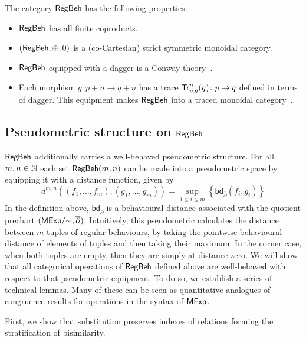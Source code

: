 \begin{theorem}
	The category $\mathsf{RegBeh}$ has the following properties:
	\begin{itemize}
		\item $\mathsf{RegBeh}$ has all finite coproducts. 
		\item $(\mathsf{RegBeh}, \oplus, 0)$ is a (co-Cartesian) strict symmetric monoidal category.
		\item $\mathsf{RegBeh}$ equipped with a dagger is a Conway theory~\cite{Esik:1999:Group}.
		\item Each morphism $g \colon p + n \to q + n$ has a trace $\mathsf{Tr}^{n}_{p,q}(g) \colon p \to q$ defined in terms of dagger. This equipment makes $\mathsf{RegBeh}$ into a traced monoidal category~\cite{Joyal:1996:Traced}. 
	\end{itemize}
\end{theorem} 
\subsection{Pseudometric structure on $\mathsf{RegBeh}$}
$\mathsf{RegBeh}$ additionally carries a well-behaved pseudometric structure. For all $m,n \in \mathbb{N}$ each set $\mathsf{RegBeh}(m,n)$ can be made into a pseudometric space by equipping it with a distance function, given by $$d^{m,n}((f_1, \dots, f_m), (g_1, \dots, g_m)) = \sup_{1 \leq i \leq m} \left\{ \mathsf{bd}_{\overline{\partial}}(f_i, g_i) \right\}$$
In the definition above, $\mathsf{bd}_{\overline{\partial}}$ is a behavioural distance associated with the quotient prechart $({\mathsf{MExp}}/{\sim}, \overline{\partial} )$. Intuitively, this pseudometric calculates the distance between $m$-tuples of regular behaviours, by taking the pointwise behavioural distance of elements of tuples and then taking their maximum. In the corner case, when both tuples are empty, then they are simply at distance zero. We will show that all categorical operations of $\mathsf{RegBeh}$ defined above are well-behaved with respect to that pseudometric equipment. To do so, we establish a series of technical lemmas. Many of these can be seen as quantitative analogues of congruence results for operations in the syntax of $\mathsf{MExp}$.

First, we show that substitution preserves indexes of relations forming the stratification of bisimilarity.

